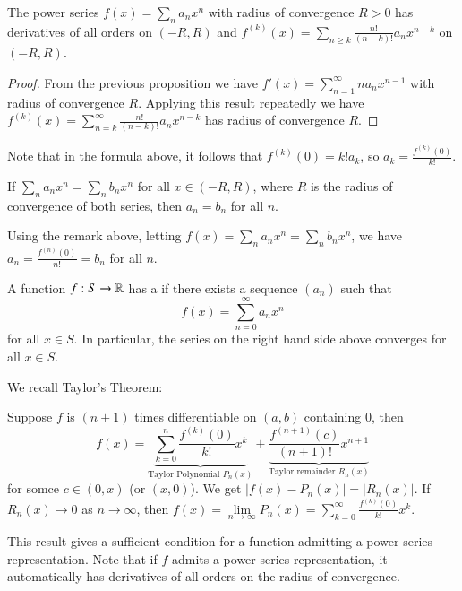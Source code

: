 \begin{corollary}
    The power series $f(x) = \sum_na_nx^n$ with radius of convergence $R > 0$ has derivatives of all orders on $(-R,R)$ and $f^{(k)}(x) = \sum_{n\geq k}\frac{n!}{(n-k)!}a_nx^{n-k}$ on $(-R,R)$.
\end{corollary}
\begin{proof}
    From the previous proposition we have $f'(x) = \sum_{n=1}^{\infty}na_nx^{n-1}$ with radius of convergence $R$. Applying this result repeatedly we have $f^{(k)}(x) = \sum_{n=k}^{\infty}\frac{n!}{(n-k)!}a_nx^{n-k}$ has radius of convergence $R$.
\end{proof}

Note that in the formula above, it follows that $f^{(k)}(0) = k!a_k$, so $a_k = \frac{f^{(k)}(0)}{k!}$.

\begin{corollary}
    If $\sum_na_nx^n = \sum_nb_nx^n$ for all $x \in (-R,R)$, where $R$ is the radius of convergence of both series, then $a_n = b_n$ for all $n$.
\end{corollary}
Using the remark above, letting $f(x) = \sum_na_nx^n = \sum_nb_nx^n$, we have $a_n = \frac{f^{(n)}(0)}{n!} = b_n$ for all $n$.

\begin{definition}
    A function $f:S\rightarrow \mathbb R$ has a  if there exists a sequence $(a_n)$ such that $$f(x) = \sum_{n=0}^{\infty}a_nx^n$$ for all $x \in S$. In particular, the series on the right hand side above converges for all $x \in S$.
\end{definition}

We recall Taylor's Theorem:

\begin{theorem}
    Suppose $f$ is $(n+1)$ times differentiable on $(a,b)$ containing $0$, then $$f(x) = \underbrace{\sum_{k=0}^n\frac{f^{(k)}(0)}{k!}x^k}_{\text{Taylor Polynomial } P_n(x)} + \underbrace{\frac{f^{(n+1)}(c)}{(n+1)!}x^{n+1}}_{\text{Taylor remainder }R_n(x)}$$ for somce $c \in (0,x)$ (or $(x,0)$). We get $|f(x) - P_n(x)| = |R_n(x)|$. If $R_n(x)\rightarrow 0$ as $n\rightarrow \infty$, then $f(x) = \lim\limits_{n\rightarrow \infty}P_n(x) = \sum_{k=0}^{\infty}\frac{f^{(k)}(0)}{k!}x^k$.
\end{theorem}

This result gives a sufficient condition for a function admitting a power series representation. Note that if $f$ admits a power series representation, it automatically has derivatives of all orders on the radius of convergence.

